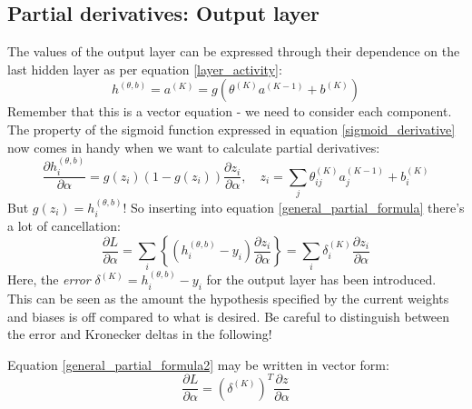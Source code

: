 \documentclass[12pt, a4paper]{article}
\numberwithin{equation}{section}
\begin{document}
\subsection{Partial derivatives: Output layer}
The values of the output layer can be expressed through their dependence on the last hidden layer as per equation \ref{layer_activity}:
\begin{equation}
h^{(\theta,b)}=a^{(K)}=g(\theta^{(K)}a^{(K-1)}+b^{(K)})
\end{equation}
Remember that this is a vector equation - we need to consider each component. The property of the sigmoid function expressed in equation \ref{sigmoid_derivative} now comes in handy when we want to calculate partial derivatives:
\begin{equation}
\frac{\partial h^{(\theta,b)}_i}{\partial\alpha}=g(z_i)(1-g(z_i))\frac{\partial z_i}{\partial\alpha},\quad z_i=\sum_j\theta^{(K)}_{ij}a^{(K-1)}_j+b^{(K)}_i
\end{equation}
But $g(z_i)=h^{(\theta,b)}_i$! So inserting into equation \ref{general_partial_formula} there's a lot of cancellation:
\begin{equation}
\frac{\partial L}{\partial\alpha}=\sum_i\left\{\left(h^{(\theta,b)}_i-y_i\right)\frac{\partial z_i}{\partial\alpha}\right\}=\sum_i\delta^{(K)}_i\frac{\partial z_i}{\partial\alpha}
\label{general_partial_formula2}
\end{equation}
Here, the \textit{error} $\delta^{(K)}=h^{(\theta,b)}_i-y_i$ for the output layer has been introduced. This can be seen as the amount the hypothesis specified by the current weights and biases is off compared to what is desired. Be careful to distinguish between the error and Kronecker deltas in the following!

Equation \ref{general_partial_formula2} may be written in vector form:
\begin{equation}
\frac{\partial L}{\partial\alpha}=\left(\delta^{(K)}\right)^T\frac{\partial z}{\partial\alpha}
\end{equation}
\end{document}
